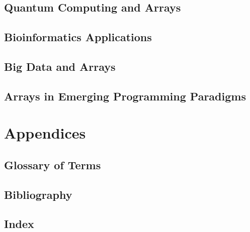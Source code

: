 \documentclass[12pt, oneside]{book}
\begin{document}
\section{Quantum Computing and Arrays}
\section{Bioinformatics Applications}
\section{Big Data and Arrays}
\section{Arrays in Emerging Programming Paradigms}
\chapter{Appendices}
\section{Glossary of Terms}
\section{Bibliography}
\section{Index}
\end{document}
